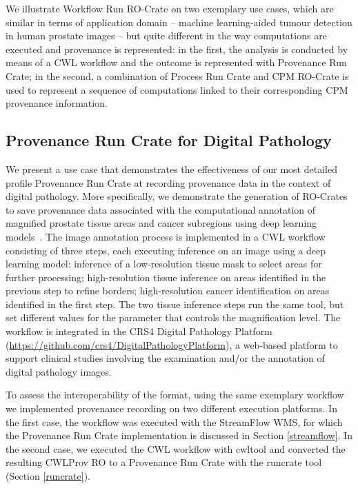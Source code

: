 \documentclass[10pt,letterpaper]{article}
\begin{document}
We illustrate Workflow Run RO-Crate on two exemplary use cases, which are similar in terms of application domain -- machine learning-aided tumour detection in human prostate images -- but quite different in the way computations are executed and provenance is represented: in the first, the analysis is conducted by means of a CWL workflow and the outcome is represented with Provenance Run Crate; in the second, a combination of Process Run Crate and CPM RO-Crate is used to represent a sequence of computations linked to their corresponding CPM provenance information.


\subsection{Provenance Run Crate for Digital Pathology}\label{provenance-run-crate-for-digital-pathology}

We present a use case that demonstrates the effectiveness of our most detailed profile Provenance Run Crate at recording provenance data in the context of digital pathology.
More specifically, we demonstrate the generation of RO-Crates to save provenance data associated with the computational annotation of magnified prostate tissue areas and cancer subregions using deep learning models~\cite{Del Rio 2022}.
The image annotation process is implemented in a CWL workflow consisting of three steps, each executing inference on an image using a deep learning model: inference of a low-resolution tissue mask to select areas for further processing;
high-resolution tissue inference on areas identified in the previous step to refine borders; high-resolution cancer identification on areas identified in the first step.
The two tissue inference steps run the same tool, but set different values for the parameter that controls the magnification level.
The workflow is integrated in the CRS4 Digital Pathology Platform (\url{https://github.com/crs4/DigitalPathologyPlatform}), a web-based platform to support clinical studies involving the examination and/or the annotation of digital pathology images.

To assess the interoperability of the format, using the same exemplary workflow we implemented provenance recording on two different execution platforms.
In the first case, the workflow was executed with the StreamFlow WMS, for which the Provenance Run Crate implementation is discussed in Section \ref{streamflow}.
In the second case, we executed the CWL workflow with cwltool and converted the resulting CWLProv RO to a Provenance Run Crate with the runcrate tool (Section \ref{runcrate}).
\end{document}
